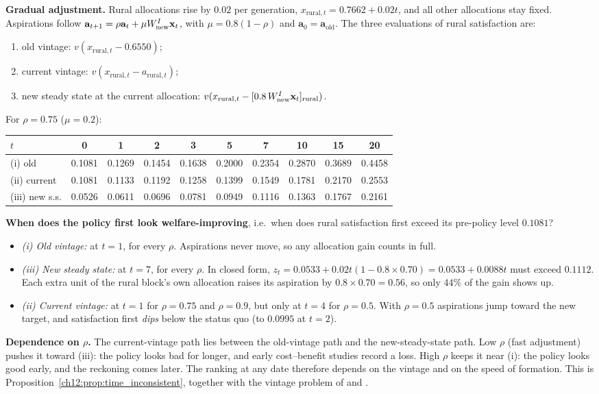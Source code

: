 \documentclass[../solutions_manual.tex]{subfiles}
\begin{document}
\textbf{Gradual adjustment.} Rural allocations rise by $0.02$ per generation, $x_{\text{rural},t} = 0.7662 + 0.02t$, and all other allocations stay fixed. Aspirations follow $\mathbf{a}_{t+1} = \rho\mathbf{a}_t + \mu W^I_{\text{new}}\mathbf{x}_t$, with $\mu = 0.8(1-\rho)$ and $\mathbf{a}_0 = \mathbf{a}_{\text{old}}$. The three evaluations of rural satisfaction are:
\begin{enumerate}
\item[(i)] old vintage: $v(x_{\text{rural},t} - 0.6550)$;
\item[(ii)] current vintage: $v(x_{\text{rural},t} - a_{\text{rural},t})$;
\item[(iii)] new steady state at the current allocation: $v(x_{\text{rural},t} - [0.8\,W^I_{\text{new}}\mathbf{x}_t]_{\text{rural}})$.
\end{enumerate}
For $\rho = 0.75$ ($\mu = 0.2$):
\begin{center}
\small\setlength{\tabcolsep}{4pt}
\begin{tabular}{lccccccccc}
\toprule
$t$ & 0 & 1 & 2 & 3 & 5 & 7 & 10 & 15 & 20 \\
\midrule
(i) old & 0.1081 & 0.1269 & 0.1454 & 0.1638 & 0.2000 & 0.2354 & 0.2870 & 0.3689 & 0.4458 \\
(ii) current & 0.1081 & 0.1133 & 0.1192 & 0.1258 & 0.1399 & 0.1549 & 0.1781 & 0.2170 & 0.2553 \\
(iii) new s.s. & 0.0526 & 0.0611 & 0.0696 & 0.0781 & 0.0949 & 0.1116 & 0.1363 & 0.1767 & 0.2161 \\
\bottomrule
\end{tabular}
\end{center}
\textbf{When does the policy first look welfare-improving}, i.e.\ when does rural satisfaction first exceed its pre-policy level $0.1081$?
\begin{itemize}
\item \emph{(i) Old vintage:} at $t = 1$, for every $\rho$. Aspirations never move, so any allocation gain counts in full.
\item \emph{(iii) New steady state:} at $t = 7$, for every $\rho$. In closed form, $z_t = 0.0533 + 0.02t(1 - 0.8\times 0.70) = 0.0533 + 0.0088t$ must exceed $0.1112$. Each extra unit of the rural block's own allocation raises its aspiration by $0.8\times 0.70 = 0.56$, so only $44\%$ of the gain shows up.
\item \emph{(ii) Current vintage:} at $t = 1$ for $\rho = 0.75$ and $\rho = 0.9$, but only at $t = 4$ for $\rho = 0.5$. With $\rho = 0.5$ aspirations jump toward the new target, and satisfaction first \emph{dips} below the status quo (to $0.0995$ at $t = 2$).
\end{itemize}
\textbf{Dependence on $\rho$.} The current-vintage path lies between the old-vintage path and the new-steady-state path. Low $\rho$ (fast adjustment) pushes it toward (iii): the policy looks bad for longer, and early cost--benefit studies record a loss. High $\rho$ keeps it near (i): the policy looks good early, and the reckoning comes later. The ranking at any date therefore depends on the vintage and on the speed of formation. This is Proposition~\ref{ch12:prop:time_inconsistent}, together with the vintage problem of \citet{weizsacker1971notes} and \citet{hammond1976endogenous}.
\end{document}
